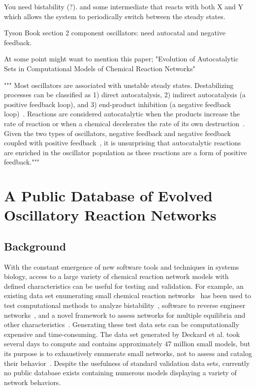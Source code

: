 \documentclass[12pt]{report}
\begin{document}
You need bistability (?). and some intermediate that reacts with both X and Y which allows the system to periodically switch between the steady states.

Tyson Book section
2 component oscillators: need autocatal and negative feedback. 

At some point might want to mention this paper; "Evolution of Autocatalytic Sets in Computational Models
of Chemical Reaction Networks"

"""
Most oscillators are associated with unstable steady states. Destabilizing processes can be classified as 1) direct autocatalysis, 2) indirect autocatalysis (a positive feedback loop), and 3) end-product inhibition (a negative feedback loop)~\cite{Tyson1975, tyson2007}. Reactions are considered autocatalytic when the products increase the rate of reaction or when a chemical decelerates the rate of its own destruction~\cite{Tyson2004}. Given the two types of oscillators, negative feedback and negative feedback coupled with positive feedback~\cite{Sauro_dynamics}, it is unsurprising that autocatalytic reactions are enriched in the oscillator population as these reactions are a form of positive feedback."""

\chapter{A Public Database of Evolved Oscillatory Reaction Networks}
\label{chap: cesium_paper}
\section{Background}
With the constant emergence of new software tools and techniques in systems biology, access to a large variety of chemical reaction network models with defined characteristics can be useful for testing and validation. For example, an existing data set enumerating small chemical reaction networks~\cite{deckard2009} has been used to test computational methods to analyze bistability~\cite{pantea2010}, software to reverse engineer networks~\cite{nobile2013}, and a novel framework to assess networks for multiple equilibria and other characteristics~\cite{donnell2014}. Generating these test data sets can be computationally expensive and time-consuming. The data set generated by Deckard et al. took several days to compute and contains approximately 47 million small models, but its purpose is to exhaustively enumerate small networks, not to assess and catalog their behavior~\cite{deckard2009}.  Despite the usefulness of standard validation data sets, currently no public database exists containing numerous models displaying a variety of network behaviors.
\end{document}
